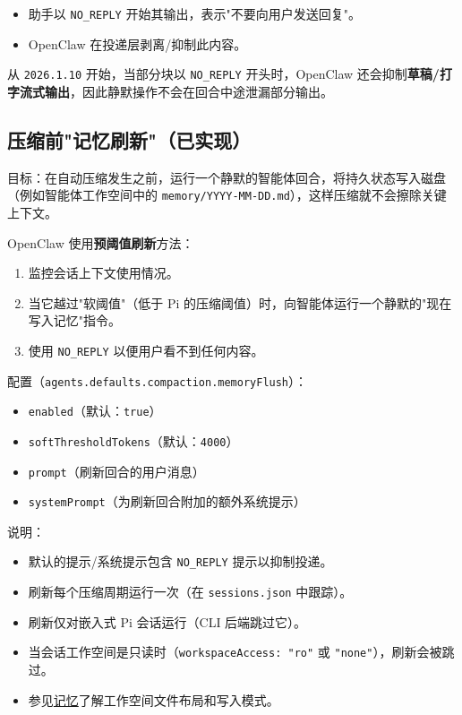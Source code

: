 \begin{itemize}
  \item 助手以 \texttt{NO\_REPLY} 开始其输出，表示"不要向用户发送回复"。
  \item OpenClaw 在投递层剥离/抑制此内容。
\end{itemize}


从 \texttt{2026.1.10} 开始，当部分块以 \texttt{NO\_REPLY} 开头时，OpenClaw 还会抑制\textbf{草稿/打字流式输出}，因此静默操作不会在回合中途泄漏部分输出。

\hrulefill


\subsection{压缩前"记忆刷新"（已实现）}


目标：在自动压缩发生之前，运行一个静默的智能体回合，将持久状态写入磁盘（例如智能体工作空间中的 \texttt{memory/YYYY-MM-DD.md}），这样压缩就不会擦除关键上下文。

OpenClaw 使用\textbf{预阈值刷新}方法：

\begin{enumerate}
  \item 监控会话上下文使用情况。
  \item 当它越过"软阈值"（低于 Pi 的压缩阈值）时，向智能体运行一个静默的"现在写入记忆"指令。
  \item 使用 \texttt{NO\_REPLY} 以便用户看不到任何内容。
\end{enumerate}


配置（\texttt{agents.defaults.compaction.memoryFlush}）：

\begin{itemize}
  \item \texttt{enabled}（默认：\texttt{true}）
  \item \texttt{softThresholdTokens}（默认：\texttt{4000}）
  \item \texttt{prompt}（刷新回合的用户消息）
  \item \texttt{systemPrompt}（为刷新回合附加的额外系统提示）
\end{itemize}


说明：

\begin{itemize}
  \item 默认的提示/系统提示包含 \texttt{NO\_REPLY} 提示以抑制投递。
  \item 刷新每个压缩周期运行一次（在 \texttt{sessions.json} 中跟踪）。
  \item 刷新仅对嵌入式 Pi 会话运行（CLI 后端跳过它）。
  \item 当会话工作空间是只读时（\texttt{workspaceAccess: "ro"} 或 \texttt{"none"}），刷新会被跳过。
  \item 参见\href{/concepts/memory}{记忆}了解工作空间文件布局和写入模式。
\end{itemize}


